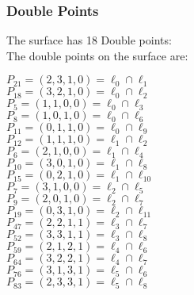 \documentclass{article}
\begin{document}
{\subsubsection*{Double Points}
The surface has 18 Double points:\\
The double points on the surface are:\\
\begin{multicols}{2}
\noindent
$P_{21} = ( 2, 3, 1, 0 ) = \ell_{0} \cap \ell_{1} $\\
$P_{18} = ( 3, 2, 1, 0 ) = \ell_{0} \cap \ell_{2} $\\
$P_{5} = ( 1, 1, 0, 0 ) = \ell_{0} \cap \ell_{3} $\\
$P_{8} = ( 1, 0, 1, 0 ) = \ell_{0} \cap \ell_{6} $\\
$P_{11} = ( 0, 1, 1, 0 ) = \ell_{0} \cap \ell_{9} $\\
$P_{12} = ( 1, 1, 1, 0 ) = \ell_{1} \cap \ell_{2} $\\
$P_{6} = ( 2, 1, 0, 0 ) = \ell_{1} \cap \ell_{4} $\\
$P_{10} = ( 3, 0, 1, 0 ) = \ell_{1} \cap \ell_{8} $\\
$P_{15} = ( 0, 2, 1, 0 ) = \ell_{1} \cap \ell_{10} $\\
$P_{7} = ( 3, 1, 0, 0 ) = \ell_{2} \cap \ell_{5} $\\
$P_{9} = ( 2, 0, 1, 0 ) = \ell_{2} \cap \ell_{7} $\\
$P_{19} = ( 0, 3, 1, 0 ) = \ell_{2} \cap \ell_{11} $\\
$P_{47} = ( 2, 2, 1, 1 ) = \ell_{3} \cap \ell_{7} $\\
$P_{52} = ( 3, 3, 1, 1 ) = \ell_{3} \cap \ell_{8} $\\
$P_{59} = ( 2, 1, 2, 1 ) = \ell_{4} \cap \ell_{6} $\\
$P_{64} = ( 3, 2, 2, 1 ) = \ell_{4} \cap \ell_{7} $\\
$P_{76} = ( 3, 1, 3, 1 ) = \ell_{5} \cap \ell_{6} $\\
$P_{83} = ( 2, 3, 3, 1 ) = \ell_{5} \cap \ell_{8} $\\
\end{multicols}
}
\end{document}
